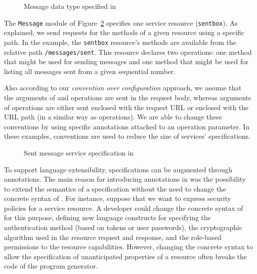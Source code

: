 \begin{figure}[htb]
\begin{small}

\vspace{-.5cm}
\end{small} 
\caption{Message data type specified in \neoidl}
\label{lst:messagedata-neo}
\end{figure}

The \texttt{Message} module of Figure~\ref{lst:sentmessage-neo}
specifies one service resource (\texttt{sentbox}). As explained,
we send requests for the methods of a given resource using a specific
path. In the example, the \texttt{sentbox} resource's
methods are available from the relative path
\texttt{/messages/sent}. This resource declares 
 two operations: one
 method that might be used for
sending messages and one  method 
that might be used for listing all messages
sent from a given sequential number.

Also according to our \emph{convention over configuration}
approach, we assume
that the arguments of  and  operations
are sent in the 
request body, whereas arguments of  operations are
either sent enclosed
with the request URL or enclosed with the URL path (in a similar way
as  operations). We are able to change these conventions by
using specific annotations attached to an operation parameter.  In
these examples, conventions are used to reduce the size of services'
specifications. 

\begin{figure}[htb]
\begin{small}

\end{small}
\caption{Sent message service specification in \neoidl}
\label{lst:sentmessage-neo}
\end{figure}

To support language extensibility, \neoidl{}
specifications can be augmented through annotations. The main reason
for introducing annotations in \neoidl{} was the possibility to extend
the semantics of a specification without the need to change the 
concrete syntax of \neoidl. For instance, suppose that we want to 
express security policies for a service resource. A developer could 
change the concrete syntax of \neoidl{} for this purpose, defining new
language constructs for specifying the authentication method (based on
tokens or user passwords), the cryptographic algorithm used in the
resource request and response, and the role-based permissions to the
resource capabilities. However,
changing the concrete syntax to allow the specification of
unanticipated properties of a resource often breaks the code of the program
generator. 

